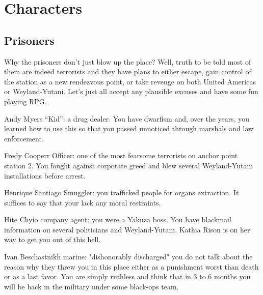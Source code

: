\chapter{Characters}


\section{Prisoners}


Why the prisoners don't just blow up the place? Well, truth to be told most of them are indeed terrorists and they have plans to either escape, gain control of the station as a new rendezvous point, or take revenge on both United Americas or  Weyland-Yutani. Let's just all accept any plausible excuses and have some fun playing RPG. 



\begin{rpg-commentbox}{Andy Myers}
    ``Kid'': a drug dealer. You have dwarfism and, over the years, you learned how to use this so that you passed unnoticed through marshals and law enforcement. 
\end{rpg-commentbox}

\begin{rpg-commentbox}{Fredy Cooperr}
    Officer: one of the most fearsome terrorists on anchor point station 2. You fought against corporate greed and blew several Weyland-Yutani installations before arrest. 
\end{rpg-commentbox}


\begin{rpg-commentbox}{Henrique Santiago}
    Smuggler: you trafficked people for organs extraction. It suffices to say that your lack any moral restraints.
\end{rpg-commentbox}

\begin{rpg-commentbox}{Hite Chyio}
    company agent: you were a Yakuza boss. You have blackmail information on several politicians and Weyland-Yutani. Kathia Rison is on her way to get you out of this hell. 
    
\end{rpg-commentbox}

\begin{rpg-commentbox}{Ivan Beschastnikh}
    marine: "dishonorably discharged" you do not talk about the reason why they threw you in this place either as a punishment worst than death or as a last favor. You are simply ruthless and think that in 3 to 6 months you will be back in the military under some black-ops team.
\end{rpg-commentbox}

